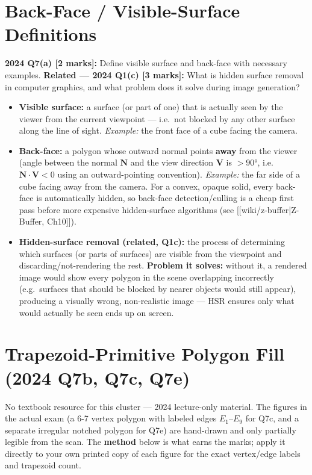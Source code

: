 \documentclass[12pt, a4paper]{article}
\newenvironment{solutionbox}{\begin{mdframed}[style=solutionframe]}{\end{mdframed}}
\newenvironment{answerbox}{\begin{mdframed}[style=answerframe]}{\end{mdframed}}
\newenvironment{notesbox}{\begin{mdframed}[style=notesframe]}{\end{mdframed}}
\begin{document}
\section{Back-Face / Visible-Surface Definitions}
\begin{solutionbox}
\textbf{2024 Q7(a) [2 marks]:} Define visible surface and back-face with necessary examples.
\textbf{Related --- 2024 Q1(c) [3 marks]:} What is hidden surface removal in computer graphics, and what problem does it solve during image generation?
\end{solutionbox}
\begin{answerbox}
\begin{itemize}[noitemsep]
  \item \textbf{Visible surface:} a surface (or part of one) that is actually seen by the viewer from the current viewpoint --- i.e.\ not blocked by any other surface along the line of sight. \emph{Example:} the front face of a cube facing the camera.
  \item \textbf{Back-face:} a polygon whose outward normal points \textbf{away} from the viewer (angle between the normal $\mathbf{N}$ and the view direction $\mathbf{V}$ is $>90°$, i.e.\ $\mathbf{N}\cdot\mathbf{V}<0$ using an outward-pointing convention). \emph{Example:} the far side of a cube facing away from the camera. For a convex, opaque solid, every back-face is automatically hidden, so back-face detection/culling is a cheap first pass before more expensive hidden-surface algorithms (see [[wiki/z-buffer|Z-Buffer, Ch10]]).
  \item \textbf{Hidden-surface removal (related, Q1c):} the process of determining which surfaces (or parts of surfaces) are visible from the viewpoint and discarding/not-rendering the rest. \textbf{Problem it solves:} without it, a rendered image would show every polygon in the scene overlapping incorrectly (e.g.\ surfaces that should be blocked by nearer objects would still appear), producing a visually wrong, non-realistic image — HSR ensures only what would actually be seen ends up on screen.
\end{itemize}
\end{answerbox}

\section{Trapezoid-Primitive Polygon Fill (2024 Q7b, Q7c, Q7e)}
\begin{notesbox}
No textbook resource for this cluster --- 2024 lecture-only material. The figures in the actual exam (a 6-7 vertex polygon with labeled edges $E_1$--$E_9$ for Q7c, and a separate irregular notched polygon for Q7e) are hand-drawn and only partially legible from the scan. The \textbf{method} below is what earns the marks; apply it directly to your own printed copy of each figure for the exact vertex/edge labels and trapezoid count.
\end{notesbox}
\end{document}
